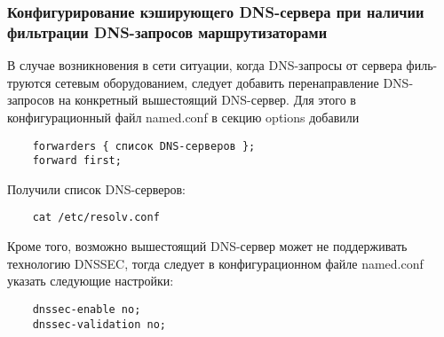 \subsubsection{Конфигурирование кэширующего DNS-сервера при наличии фильтрации DNS-запросов маршрутизаторами}
В случае возникновения в сети ситуации, когда DNS-запросы от сервера филь- труются сетевым оборудованием, следует добавить перенаправление DNS-запросов на конкретный вышестоящий DNS-сервер. Для этого в конфигурационный файл named.conf в секцию options добавили
        \begin{verbatim}
    forwarders { список DNS-серверов };
    forward first;
        \end{verbatim}
Получили список DNS-серверов:
        \begin{verbatim}
    cat /etc/resolv.conf
        \end{verbatim}
Кроме того, возможно вышестоящий DNS-сервер может не поддерживать технологию DNSSEC, тогда следует в конфигурационном файле named.conf указать следующие настройки:
        \begin{verbatim}
    dnssec-enable no;
    dnssec-validation no;
        \end{verbatim}
